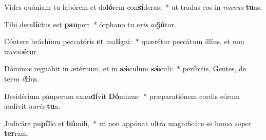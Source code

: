 \item Vides quóniam tu labórem et do\textbf{ló}rem con\textbf{sí}deras:~* ut tradas eos in \textit{ma}\textit{nus} \textbf{tu}as.
\item Tibi dere\textbf{líc}tus est \textbf{pau}per:~* órphano tu e\textit{ris} \textit{ad}\textbf{jú}tor.
\item Cóntere bráchium peccatóris \textbf{et} ma\textbf{lí}gni:~* quærétur peccátum illíus, et non in\textit{ve}\textit{ni}\textbf{é}tur.
\item Dóminus regnábit in ætérnum, et in \textbf{sǽ}culum \textbf{sǽ}culi:~* períbitis, Gentes, de ter\textit{ra} \textit{il}\textbf{lí}us.
\item Desidérium páuperum exau\textbf{dí}vit \textbf{Dó}minus:~* præparatiónem cordis eórum audívit \textit{au}\textit{ris} \textbf{tu}a.
\item Judicáre pu\textbf{píl}lo et \textbf{hú}mili,~* ut non appónat ultra magnificáre se homo \textit{su}\textit{per} \textbf{ter}ram.
